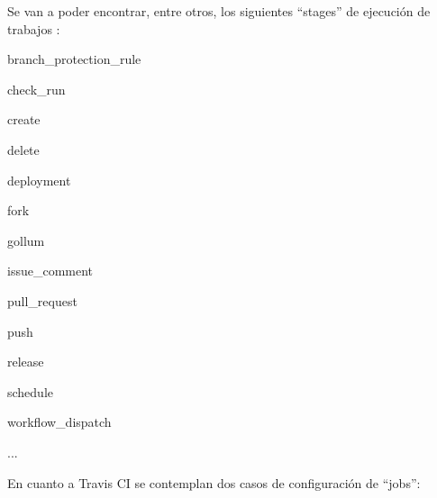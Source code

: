 Se van a poder encontrar, entre otros, los siguientes ``stages'' de ejecución de trabajos \cite{stagesGitHubActions}:
\begin{compactitem}
    \item branch\_protection\_rule
    \item check\_run
    \item create
    \item delete
    \item deployment
    \item fork
    \item gollum
    \item issue\_comment
    \item pull\_request
    \item push
    \item release
    \item schedule
    \item workflow\_dispatch
    \item ...
\end{compactitem} 

En cuanto a Travis CI se contemplan dos casos de configuración de ``jobs'':

